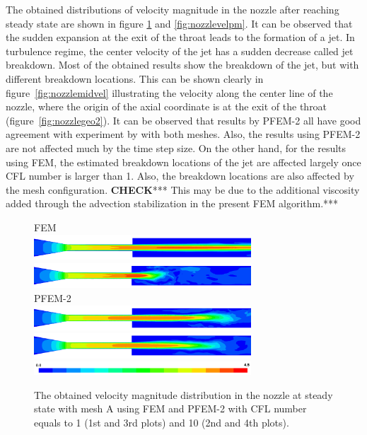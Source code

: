 The obtained distributions of velocity magnitude in the nozzle after reaching steady state are shown in figure \ref{fig:nozzlevelfm} and \ref{fig:nozzlevelpm}. It can be observed that the sudden expansion at the exit of the throat leads to the formation of a jet. In turbulence regime, the center velocity of the jet has a sudden decrease called jet breakdown. Most of the obtained results show the breakdown of the jet, but with different breakdown locations. This can be shown clearly in figure~\ref{fig:nozzlemidvel} illustrating the velocity along the center line of the nozzle, where the origin of the axial coordinate is at the exit of the throat (figure~\ref{fig:nozzlegeo2}). It can be observed that results by PFEM-2 all have good agreement with experiment by \cite{hariharan_nozzle} with both meshes. Also, the results using PFEM-2 are not affected much by the time step size. On the other hand, for the results using FEM, the estimated breakdown locations of the jet are affected largely once CFL number is larger than 1. Also, the breakdown locations are also affected by the mesh configuration. \textbf{CHECK}*** This may be due to the additional viscosity added through the advection stabilization in the present FEM algorithm.***

\begin{figure}[htbp]
    \centering
    FEM\\
    \includegraphics[width=3.2in]{imgs/nozzle_pump/nozzle_fem_fm_cfl1.png}
    \includegraphics[width=3.2in]{imgs/nozzle_pump/nozzle_fem_fm_cfl5.png}\\
    PFEM-2\\
    \includegraphics[width=3.2in]{imgs/nozzle_pump/nozzle_pfem_fm_cfl1.png}
    \includegraphics[width=3.2in]{imgs/nozzle_pump/nozzle_pfem_fm_cfl5.png}
    \includegraphics[width=3.2in]{imgs/nozzle_pump/nozzle_legend.png}
    \caption{The obtained velocity magnitude distribution in the nozzle at steady state with mesh A using FEM and PFEM-2 with CFL number equals to 1 (1st and 3rd plots) and 10 (2nd and 4th plots). }
    \label{fig:nozzlevelfm}
\end{figure}

